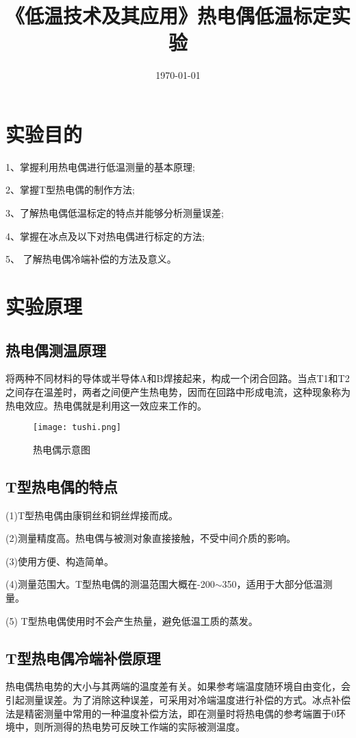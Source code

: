\documentclass[UTF8,a4paper,10pt]{ctexart}
\title{\textbf{《低温技术及其应用》热电偶低温标定实验}}
\author{}
\date{\today}
\begin{document}
	\maketitle
	\section{实验目的}
	
	1、掌握利用热电偶进行低温测量的基本原理;
	
	2、掌握T型热电偶的制作方法;
	
	3、了解热电偶低温标定的特点并能够分析测量误差;
	
	4、掌握在冰点及以下对热电偶进行标定的方法;
	
	5、 了解热电偶冷端补偿的方法及意义。
	
	\section{实验原理}
	\subsection{热电偶测温原理}
	
	将两种不同材料的导体或半导体A和B焊接起来，构成一个闭合回路。当点T1和T2之间存在温差时，两者之间便产生热电势，因而在回路中形成电流，这种现象称为热电效应。热电偶就是利用这一效应来工作的。
	\begin{figure}[h]
		\centering
		\texttt{[image: tushi.png]}
		\caption{热电偶示意图}
	\end{figure}
	\subsection{T型热电偶的特点}
	
	(1)T型热电偶由康铜丝和铜丝焊接而成。
	
	(2)测量精度高。热电偶与被测对象直接接触，不受中间介质的影响。
	
	(3)使用方便、构造简单。
	
	(4)测量范围大。T型热电偶的测温范围大概在-200\textcelsius$\sim $350\textcelsius，适用于大部分低温测量。
	
	(5) T型热电偶使用时不会产生热量，避免低温工质的蒸发。
	
	\subsection{T型热电偶冷端补偿原理}
	
	热电偶热电势的大小与其两端的温度差有关。如果参考端温度随环境自由变化，会引起测量误差。为了消除这种误差，可采用对冷端温度进行补偿的方式。冰点补偿法是精密测量中常用的一种温度补偿方法，即在测量时将热电偶的参考端置于0\textcelsius 环境中，则所测得的热电势可反映工作端的实际被测温度。
	
\end{document}

